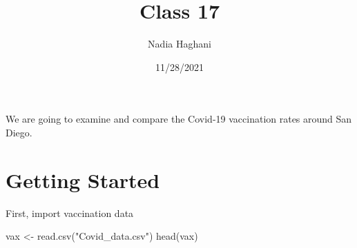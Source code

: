 \documentclass[
]{article}
\title{Class 17}
\author{Nadia Haghani}
\date{11/28/2021}
\newenvironment{Shaded}{\begin{snugshade}}{\end{snugshade}}
\newcommand{\FunctionTok}[1]{\textcolor[rgb]{0.00,0.00,0.00}{#1}}
\newcommand{\NormalTok}[1]{#1}
\newcommand{\OtherTok}[1]{\textcolor[rgb]{0.56,0.35,0.01}{#1}}
\newcommand{\StringTok}[1]{\textcolor[rgb]{0.31,0.60,0.02}{#1}}
\begin{document}
\maketitle

We are going to examine and compare the Covid-19 vaccination rates
around San Diego.

\hypertarget{getting-started}{%
\section{Getting Started}\label{getting-started}}

First, import vaccination data

\begin{Shaded}
\begin{Highlighting}[]
\NormalTok{vax }\OtherTok{\textless{}{-}} \FunctionTok{read.csv}\NormalTok{(}\StringTok{"Covid\_data.csv"}\NormalTok{)}
\FunctionTok{head}\NormalTok{(vax)}
\end{Highlighting}
\end{Shaded}
\end{document}
